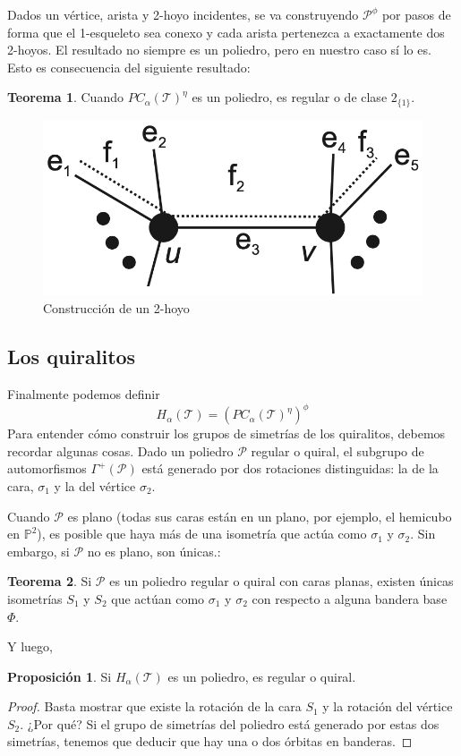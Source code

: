 \documentclass[spanish]{article}
\theoremstyle{definition}
\newtheorem*{teo}{Teorema}
\newtheorem*{prop}{Proposición}
\newcommand{\PP}{\mathbb{P}}
\newcommand{\p}{\mathcal{P}}
\newcommand{\T}{\mathcal{T}}
\begin{document}
Dados un vértice, arista y 2-hoyo incidentes, se va construyendo $\p^\phi$ por pasos de forma que el 1-esqueleto sea conexo y cada arista pertenezca a exactamente dos 2-hoyos. El resultado no siempre es un poliedro, pero en nuestro caso sí lo es. Esto es consecuencia del siguiente resultado:

\begin{teo}
	Cuando $PC_\alpha(\T)^\eta$ es un poliedro, es regular o de clase $2_{\{1\}}$.
\end{teo}

\begin{figure}[H]
	\centering
	\includegraphics[width=0.5\linewidth]{politopos4}
	\caption*{Construcción de un 2-hoyo}
\end{figure}

\subsection{Los quiralitos}
Finalmente podemos definir
\[H_\alpha(\T)=\left(PC_\alpha(\T)^\eta\right)^\phi\]
Para entender cómo construir los grupos de simetrías de los quiralitos, debemos recordar algunas cosas. Dado un poliedro $\p$ regular o quiral, el subgrupo de automorfismos $\Gamma^+(\p)$ está generado por dos rotaciones distinguidas: la de la cara, $\sigma_1$ y la del vértice $\sigma_2$.

Cuando $\p$ es plano (todas sus caras están en un plano, por ejemplo, el hemicubo en $\PP^2$), es posible que haya más de una isometría que actúa como $\sigma_1$ y $\sigma_2$.  Sin embargo, si $\p$ no es plano, son únicas.:
\begin{teo}
	Si $\p$ es un poliedro regular o quiral con caras planas, existen únicas isometrías $S_1$ y $S_2$ que actúan como $\sigma_1$ y $\sigma_2$ con respecto a alguna bandera base $\Phi$.
\end{teo}
Y luego,
\begin{prop}
	Si $H_\alpha(\T)$ es un poliedro, es regular o quiral.
\end{prop}
\begin{proof}
	Basta mostrar que existe la rotación de la cara $S_1$ y la rotación del vértice $S_2$. ¿Por qué? Si el grupo de simetrías del poliedro está generado por estas dos simetrías, tenemos que deducir que hay una o dos órbitas en banderas.
\end{proof}
\end{document}
